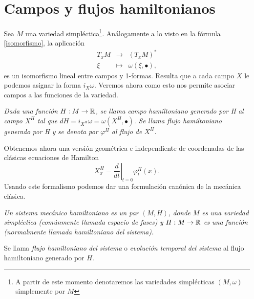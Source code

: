 \section{Campos y flujos hamiltonianos}\label{sec:hamilton}
Sea $M$ una variedad simpléctica\footnote{A partir de este momento denotaremos las variedades simplécticas $(M,\omega)$ simplemente por $M$}. Análogamente a lo visto en la fórmula \eqref{isomorfismo}, la aplicación 
  \begin{equation*}
    \begin{array}{rcl}
      T_xM & \longrightarrow & (T_xM)^* \\
      \xi & \longmapsto & \omega(\xi,\bullet),
      \end{array} 
  \end{equation*}
es un isomorfismo lineal entre campos y 1-formas. Resulta que a cada campo $X$ le podemos asignar la forma $i_X \omega$. Veremos ahora como esto nos permite asociar campos a las funciones de la variedad.
\begin{defn}
  \em
  Dada una función $H:M \rightarrow \mathbb{R}$, se llama \emph{campo hamiltoniano generado por H} al campo $X^H$ tal que $dH=i_{X^H}\omega=\omega(X^H,\bullet)$.
  Se llama \emph{flujo hamiltoniano generado por H} y se denota por $\varphi^H$ al flujo de $X^H$.
\end{defn}
  Obtenemos ahora una versión geométrica e independiente de coordenadas de las clásicas ecuaciones de Hamilton
  \begin{equation*}
    X^H_x= \left.\frac{d}{dt}\right| _{t=0}\varphi^H_t(x).
  \end{equation*}
Usando este formalismo podemos dar una formulación canónica de la mecánica clásica.
\begin{defn}
  \em
  Un \emph{sistema mecánico hamiltoniano} es un par $(M,H)$, donde $M$ es una variedad simpléctica (comúnmente llamada \emph{espacio de fases}) y $H:M \rightarrow \mathbb{R}$ es una función (normalmente llamada \emph{hamiltoniano} del sistema).

  Se llama \emph{flujo hamiltoniano del sistema} o \emph{evolución temporal del sistema} al flujo hamiltoniano generado por $H$.
\end{defn}

